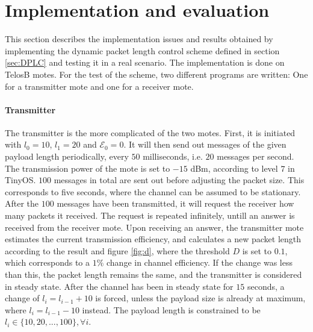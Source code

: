 \section{Implementation and evaluation}\label{sec:schemeTest}
This section describes the implementation issues and results obtained by implementing the dynamic packet length control scheme defined in section \ref{sec:DPLC} and testing it in a real scenario. The implementation is done on TelosB motes. For the test of the scheme, two different programs are written: One for a transmitter mote and one for a receiver mote. 
\paragraph{Transmitter} The transmitter is the more complicated of the two motes. First, it is initiated with $l_0 = 10$, $l_1 = 20$ and $\mathcal{E}_0 = 0$. It will then send out messages of the given payload length periodically, every $50$ milliseconds, i.e. $20$ messages per second. The transmission power of the mote is set to $-15$ dBm, according to level $7$ in TinyOS. $100$ messages in total are sent out before adjusting the packet size. This corresponds to five seconds, where the channel can be assumed to be stationary. After the $100$ messages have been transmitted, it will request the receiver how many packets it received. The request is repeated infinitely, untill an answer is received from the receiver mote. Upon receiving an answer, the transmitter mote estimates the current transmission efficiency, and calculates a new packet length according to the result and figure \ref{fig:d}, where the threshold $D$ is set to $0.1$, which corresponds to a $1 \%$ change in channel efficiency. If the change was less than this, the packet length remains the same, and the transmitter is considered in steady state. After the channel has been in steady state for $15$ seconds, a change of $l_i = l_{i-1} +10$ is forced, unless the payload size is already at maximum, where $l_i = l_{i-1} - 10$ instead. The payload length is constrained to be $l_i \in \{10, 20, ... , 100\},\forall i$.
